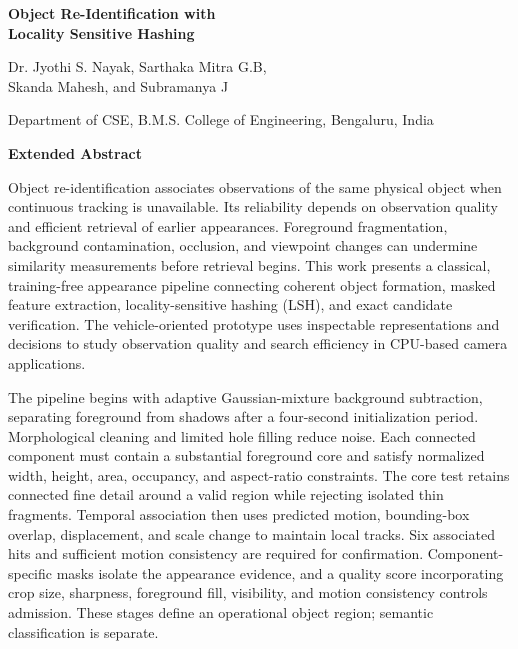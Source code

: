 \documentclass[11pt,a4paper]{article}
\begin{document}
\begin{center}
  {\Large\bfseries Object Re-Identification with\\[3pt]
  Locality Sensitive Hashing\par}
  \vspace{0.7em}
  {\normalsize Dr. Jyothi S. Nayak, Sarthaka Mitra G.B,\\
  Skanda Mahesh, and Subramanya J\par}
  \vspace{0.3em}
  {\small Department of CSE, B.M.S. College of Engineering, Bengaluru, India\par}
  \vspace{0.8em}
  {\large\bfseries Extended Abstract\par}
\end{center}

Object re-identification associates observations of the same physical object when continuous tracking is unavailable. Its reliability depends on observation quality and efficient retrieval of earlier appearances. Foreground fragmentation, background contamination, occlusion, and viewpoint changes can undermine similarity measurements before retrieval begins. This work presents a classical, training-free appearance pipeline connecting coherent object formation, masked feature extraction, locality-sensitive hashing (LSH), and exact candidate verification. The vehicle-oriented prototype uses inspectable representations and decisions to study observation quality and search efficiency in CPU-based camera applications.

The pipeline begins with adaptive Gaussian-mixture background subtraction, separating foreground from shadows after a four-second initialization period. Morphological cleaning and limited hole filling reduce noise. Each connected component must contain a substantial foreground core and satisfy normalized width, height, area, occupancy, and aspect-ratio constraints. The core test retains connected fine detail around a valid region while rejecting isolated thin fragments. Temporal association then uses predicted motion, bounding-box overlap, displacement, and scale change to maintain local tracks. Six associated hits and sufficient motion consistency are required for confirmation. Component-specific masks isolate the appearance evidence, and a quality score incorporating crop size, sharpness, foreground fill, visibility, and motion consistency controls admission. These stages define an operational object region; semantic classification is separate.
\end{document}

